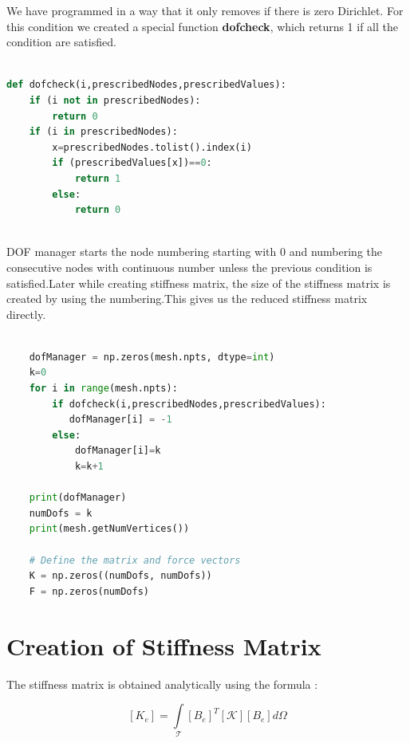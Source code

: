 \documentclass{article}
\begin{document}
We have programmed in a way that it only removes if there is zero Dirichlet. For this condition we created a special function \textbf{dofcheck}, which returns 1 if all the condition are satisfied.  
\lstset{style=mystyle}
\begin{lstlisting}[language=Python]

def dofcheck(i,prescribedNodes,prescribedValues): 
    if (i not in prescribedNodes):
        return 0 
    if (i in prescribedNodes): 
        x=prescribedNodes.tolist().index(i)
        if (prescribedValues[x])==0:
            return 1
        else:
            return 0
            
\end{lstlisting}

DOF manager starts the node numbering starting with 0 and numbering the consecutive nodes with continuous number unless the previous condition is satisfied.Later while creating stiffness matrix, the size of the stiffness matrix is created by using the numbering.This gives us the reduced stiffness matrix directly. 

\begin{lstlisting}[language=Python]

    dofManager = np.zeros(mesh.npts, dtype=int)
    k=0
    for i in range(mesh.npts):
        if dofcheck(i,prescribedNodes,prescribedValues):
           dofManager[i] = -1
        else:
            dofManager[i]=k
            k=k+1
            
    print(dofManager)
    numDofs = k
    print(mesh.getNumVertices())

    # Define the matrix and force vectors
    K = np.zeros((numDofs, numDofs))
    F = np.zeros(numDofs)

\end{lstlisting}

\section{Creation of Stiffness Matrix}


The stiffness matrix is obtained analytically using the formula :

\[ [K_e] = \int \limits_\mathcal{T} [B_e]^T [ \mathcal{K} ] [B_e]  d \Omega \]

\end{document}
